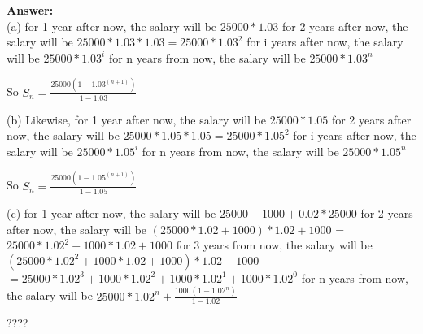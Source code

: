 \documentclass{article}
\begin{document}
\begin{large}
\textbf{Answer:} \\

(a) for 1 year after now, the salary will be $25000 * 1.03$
    for 2 years after now, the salary will be $25000 * 1.03 * 1.03 = 25000 * 1.03^2$
    for i years after now, the salary will be $25000 * 1.03^i$
    for n years from now, the salary will be $25000 * 1.03^n$

    So $S_{n} = \frac{25000 (1 - 1.03^(n+1))}{1-1.03}$

(b) Likewise, 
    for 1 year after now, the salary will be $25000 * 1.05$
    for 2 years after now, the salary will be $25000 * 1.05 * 1.05 = 25000 * 1.05^2$
    for i years after now, the salary will be $25000 * 1.05^i$
    for n years from now, the salary will be $25000 * 1.05^n$

    So $S_{n} = \frac{25000 (1 - 1.05^(n+1))}{1-1.05}$

(c) for 1 year after now, the salary will be $25000 + 1000 + 0.02 * 25000$
    for 2 years after now, the salary will be $(25000 * 1.02 + 1000) * 1.02 + 1000$
                                             = $25000 * 1.02^2 + 1000 * 1.02 + 1000$
    for 3 years from now, the salary will be $(25000 * 1.02^2 + 1000 * 1.02 + 1000) * 1.02 + 1000$
                                           $ = 25000 * 1.02^3 + 1000 * 1.02^2 + 1000 * 1.02^1 + 1000 * 1.02^0$
    for n years from now, the salary will be $25000 * 1.02^n + \frac {1000 (1 - 1.02^n)}{1 - 1.02}$

    ????

\end{large}
\end{document}
